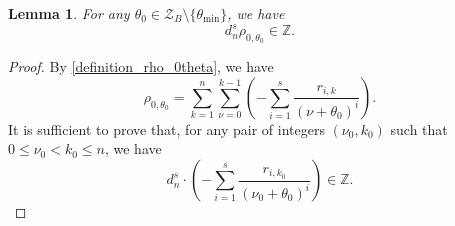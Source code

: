 \documentclass[12pt]{article}
\newtheorem{lemma}[theorem]{Lemma}
\numberwithin{equation}{section}
\begin{document}
\begin{lemma}\label{lemma_rho_0theta_general}
For any $\theta_0 \in \mathcal{Z}_{B} \setminus \{ \theta_{\min} \}$, we have
\[ d_{n}^{s} \rho_{0,\theta_0} \in \mathbb{Z}. \]
\end{lemma}

\begin{proof}
By \eqref{definition_rho_0theta}, we have
\[\rho_{0,\theta_0} = \sum_{k=1}^n\sum_{\nu=0}^{k-1} \left(-\sum_{i=1}^{s}\frac{r_{i,k}}{(\nu+\theta_0)^{i}} \right). \] 
It is sufficient to prove that, for any pair of integers $(\nu_0,k_0)$ such that $0 \leqslant \nu_0 < k_0 \leqslant n$, we have
\begin{equation}\label{Inner_sum_is_good}
d_n^{s} \cdot \left(-\sum_{i=1}^{s}\frac{r_{i,k_0}}{(\nu_0+\theta_0)^{i}} \right) \in \mathbb{Z}.
\end{equation}


\end{proof}
\end{document}
